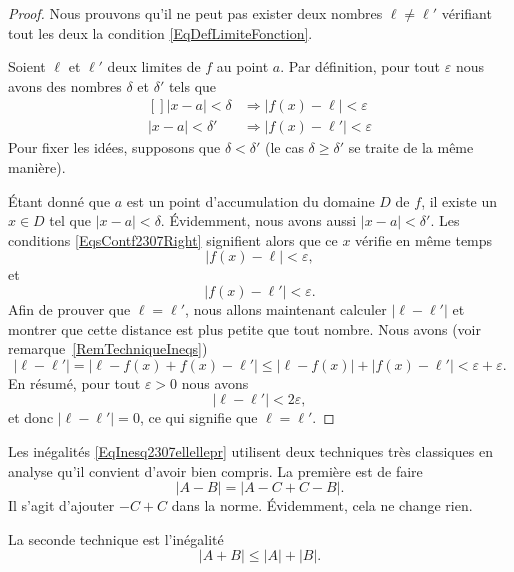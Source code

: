 \begin{proof}
	Nous prouvons qu'il ne peut pas exister deux nombres $\ell\neq\ell'$ vérifiant tout les deux la condition \eqref{EqDefLimiteFonction}.

	Soient $\ell$ et $\ell'$ deux limites de $f$ au point $a$. Par définition, pour tout $\varepsilon$ nous avons des nombres $\delta$ et $\delta'$ tels que
	\begin{equation}	\label{EqsContf2307Right}
		\begin{aligned}[]
			| x-a |<\delta  & \Rightarrow \big| f(x)-\ell \big|<\varepsilon  \\
			| x-a |<\delta' & \Rightarrow \big| f(x)-\ell' \big|<\varepsilon
		\end{aligned}
	\end{equation}
	Pour fixer les idées, supposons que $\delta<\delta'$ (le cas $\delta\geq\delta'$ se traite de la même manière).

	Étant donné que $a$ est un point d'accumulation du domaine $D$ de $f$, il existe un $x\in D$ tel que $| x-a |<\delta$. Évidemment, nous avons aussi $| x-a |<\delta'$. Les conditions \eqref{EqsContf2307Right} signifient alors que ce $x$ vérifie en même temps
	\begin{equation}
		| f(x)-\ell |<\varepsilon,
	\end{equation}
	et
	\begin{equation}
		| f(x)-\ell' |<\varepsilon.
	\end{equation}
	Afin de prouver que $\ell=\ell'$, nous allons maintenant calculer $| \ell-\ell' |$ et montrer que cette distance est plus petite que tout nombre. Nous avons (voir remarque~\ref{RemTechniqueIneqs})
	\begin{equation}	\label{EqInesq2307ellellepr}
		| \ell-\ell' |=| \ell-f(x)+f(x)-\ell' |\leq | \ell-f(x) |+| f(x)-\ell' |<\varepsilon+\varepsilon.
	\end{equation}
	En résumé, pour tout $\varepsilon>0$ nous avons
	\begin{equation}
		| \ell-\ell' |<2\varepsilon,
	\end{equation}
	et donc $| \ell-\ell' |=0$, ce qui signifie que $\ell=\ell'$.
\end{proof}

\begin{remark}		\label{RemTechniqueIneqs}
	Les inégalités \eqref{EqInesq2307ellellepr} utilisent deux techniques très classiques en analyse qu'il convient d'avoir bien compris. La première est de faire
	\begin{equation}
		| A-B |=| A-C+C-B |.
	\end{equation}
	Il s'agit d'ajouter $-C+C$ dans la norme. Évidemment, cela ne change rien.

	La seconde technique est l'inégalité
	\begin{equation}
		| A+B |\leq| A |+| B |.
	\end{equation}
\end{remark}

